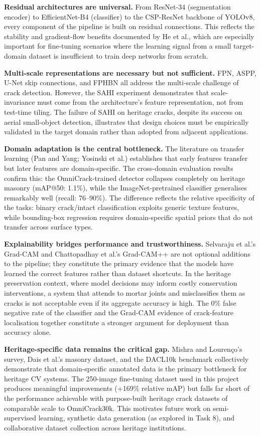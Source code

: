 \documentclass[12pt,a4paper]{article}
\begin{document}
\textbf{Residual architectures are universal.} From ResNet-34 (segmentation encoder) to EfficientNet-B4 (classifier) to the CSP-ResNet backbone of YOLOv8, every component of the pipeline is built on residual connections. This reflects the stability and gradient-flow benefits documented by He et al., which are especially important for fine-tuning scenarios where the learning signal from a small target-domain dataset is insufficient to train deep networks from scratch.

\textbf{Multi-scale representations are necessary but not sufficient.} FPN, ASPP, U-Net skip connections, and FPHBN all address the multi-scale challenge of crack detection. However, the SAHI experiment demonstrates that scale-invariance must come from the architecture's feature representation, not from test-time tiling. The failure of SAHI on heritage cracks, despite its success on aerial small-object detection, illustrates that design choices must be empirically validated in the target domain rather than adopted from adjacent applications.

\textbf{Domain adaptation is the central bottleneck.} The literature on transfer learning (Pan and Yang; Yosinski et al.) establishes that early features transfer but later features are domain-specific. The cross-domain evaluation results confirm this: the OmniCrack-trained detector collapses completely on heritage masonry (mAP@50: 1.1\%), while the ImageNet-pretrained classifier generalises remarkably well (recall: 76--90\%). The difference reflects the relative specificity of the tasks: binary crack/intact classification exploits generic texture features, while bounding-box regression requires domain-specific spatial priors that do not transfer across surface types.

\textbf{Explainability bridges performance and trustworthiness.} Selvaraju et al.'s Grad-CAM and Chattopadhay et al.'s Grad-CAM++ are not optional additions to the pipeline; they constitute the primary evidence that the models have learned the correct features rather than dataset shortcuts. In the heritage preservation context, where model decisions may inform costly conservation interventions, a system that attends to mortar joints and misclassifies them as cracks is not acceptable even if its aggregate accuracy is high. The 0\% false negative rate of the classifier and the Grad-CAM evidence of crack-feature localisation together constitute a stronger argument for deployment than accuracy alone.

\textbf{Heritage-specific data remains the critical gap.} Mishra and Louren\c{c}o's survey, Dais et al.'s masonry dataset, and the DACL10k benchmark collectively demonstrate that domain-specific annotated data is the primary bottleneck for heritage CV systems. The 250-image fine-tuning dataset used in this project produces meaningful improvements (+169\% relative mAP) but falls far short of the performance achievable with purpose-built heritage crack datasets of comparable scale to OmniCrack30k. This motivates future work on semi-supervised learning, synthetic data generation (as explored in Task 8), and collaborative dataset collection across heritage institutions.
\end{document}
